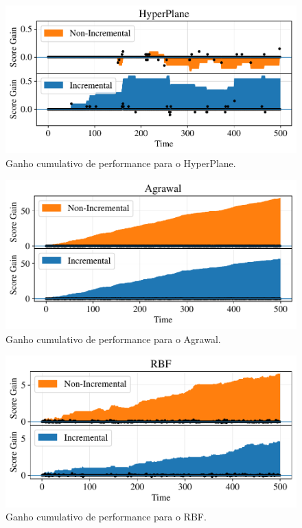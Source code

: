 \documentclass[conference,compsoc]{IEEEtran}
\begin{document}
\begin{figure}[ht]
    \centering
    \includegraphics[width=\linewidth]{imgs/hyper_cumsum.pdf}
    \caption{Ganho cumulativo de performance para o HyperPlane.}
    \label{fig:cumsum_hyper}
\end{figure}

\begin{figure}[ht]
    \centering
    \includegraphics[width=\linewidth]{imgs/agrawal_cumsum.pdf}
    \caption{Ganho cumulativo de performance para o Agrawal.}
    \label{fig:cumsum_agrawal}
\end{figure}

\begin{figure}[ht]
    \centering
    \includegraphics[width=\linewidth]{imgs/rbf_cumsum.pdf}
    \caption{Ganho cumulativo de performance para o RBF.}
    \label{fig:cumsum_rbf}
\end{figure}
\end{document}
